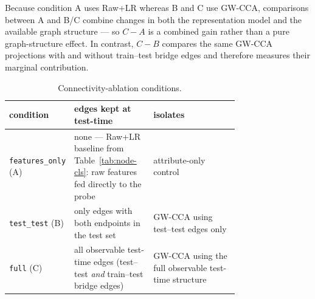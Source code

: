 \documentclass{article}
\begin{document}
Because condition A uses Raw+LR whereas B and C use GW-CCA,
comparisons between A and B/C combine changes in both the
representation model and the available graph structure --- so $C - A$
is a combined gain rather than a pure graph-structure effect. In
contrast, $C - B$ compares the same GW-CCA projections with and
without train--test bridge edges and therefore measures their
marginal contribution.

\begin{table}[!h]
\centering
\small
\caption{Connectivity-ablation conditions.}
\label{tab:conn-def}
\begin{tabular}{l p{0.35\linewidth} p{0.40\linewidth}}
\toprule
condition & edges kept at test-time & isolates \\
\midrule
\texttt{features\_only} (A) & none --- Raw+LR baseline from Table~\ref{tab:node-cls}: raw features fed directly to the probe & attribute-only control \\
\texttt{test\_test} (B)     & only edges with both endpoints in the test set & GW-CCA using test--test edges only \\
\texttt{full} (C)           & all observable test-time edges (test--test \emph{and} train--test bridge edges) & GW-CCA using the full observable test-time structure \\
\bottomrule
\end{tabular}
\end{table}
\end{document}

